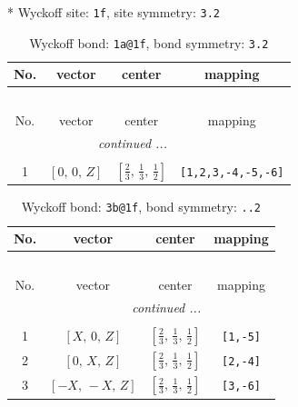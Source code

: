 \documentclass[fleqn,8pt]{jsarticle}
\begin{document}
* Wyckoff site: {\tt 1f}, site symmetry: {\tt 3.2}
\renewcommand{\arraystretch}{1.2}
\begin{longtable}{cccc}
\caption{Wyckoff bond: {\tt 1a@1f}, bond symmetry: {\tt 3.2}}
 \\
 \hline \hline
No. & vector & center & mapping \\ \hline \endfirsthead

\multicolumn{3}{l}{\tablename\ \thetable{}} \\
 \hline \hline
No. & vector & center & mapping \\ \hline \endhead

 \hline \hline
\multicolumn{3}{r}{\footnotesize\it continued ...} \\ \endfoot

 \hline \hline
\multicolumn{3}{r}{} \\ \endlastfoot

1 & $\left[ 0,\, 0,\, Z \right]$ & $\left[ \frac{2}{3},\, \frac{1}{3},\, \frac{1}{2} \right]$ & {\tt [1,2,3,-4,-5,-6]} \\
\end{longtable}
\renewcommand{\arraystretch}{1.2}
\begin{longtable}{cccc}
\caption{Wyckoff bond: {\tt 3b@1f}, bond symmetry: {\tt ..2}}
 \\
 \hline \hline
No. & vector & center & mapping \\ \hline \endfirsthead

\multicolumn{3}{l}{\tablename\ \thetable{}} \\
 \hline \hline
No. & vector & center & mapping \\ \hline \endhead

 \hline \hline
\multicolumn{3}{r}{\footnotesize\it continued ...} \\ \endfoot

 \hline \hline
\multicolumn{3}{r}{} \\ \endlastfoot

1 & $\left[ X,\, 0,\, Z \right]$ & $\left[ \frac{2}{3},\, \frac{1}{3},\, \frac{1}{2} \right]$ & {\tt [1,-5]} \\ \hline
2 & $\left[ 0,\, X,\, Z \right]$ & $\left[ \frac{2}{3},\, \frac{1}{3},\, \frac{1}{2} \right]$ & {\tt [2,-4]} \\ \hline
3 & $\left[ - X,\, - X,\, Z \right]$ & $\left[ \frac{2}{3},\, \frac{1}{3},\, \frac{1}{2} \right]$ & {\tt [3,-6]} \\
\end{longtable}
\renewcommand{\arraystretch}{1.2}
\end{document}
